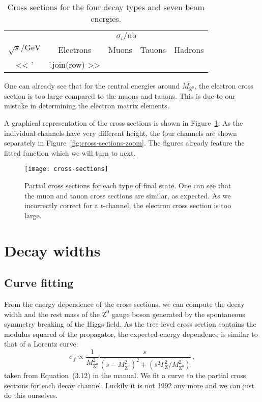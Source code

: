 \documentclass[11pt, english, fleqn, DIV=15, headinclude, BCOR=2cm]{scrreprt}
\newcommand\MZ{M_{\mathrm Z^0}}
\begin{document}
\begin{table}
    \centering
    \begin{tabular}{SSSSS}
        \toprule
        &  \\
        \cmidrule(l){2-5}
        {$\sqrt s / \si{\giga\electronvolt}$}
        & {Electrons}
        & {Muons}
        & {Tauons}
        & {Hadrons} \\
        \midrule
        << ' & '.join(row) >> \\
        \bottomrule
    \end{tabular}
    \caption{%
        Cross sections for the four decay types and seven beam energies.
    }
    \label{tab:cross-sections}
\end{table}

One can already see that for the central energies around $\MZ$, the electron
cross section is too large compared to the muons and tauons. This is due to our
mistake in determining the electron matrix elements.

A graphical representation of the cross sections is shown in
Figure~\ref{fig:cross-sections}. As the individual channels have very different
height, the four channels are shown separately in
Figure~\ref{fig:cross-sections-zoom}. The figures already feature the fitted
function which we will turn to next.

\begin{figure}
    \centering
    \texttt{[image: cross-sections]}
    \caption{%
        Partial cross sections for each type of final state. One can see that
        the muon and tauon cross sections are similar, as expected. As we
        incorrectly correct for a $t$-channel, the electron cross section is
        too large.
    }
    \label{fig:cross-sections}
\end{figure}



\section{Decay widths}

\subsection{Curve fitting}

From the energy dependence of the cross sections, we can compute the decay
width and the rest mass of the $\mathrm Z^0$ gauge boson generated by the
spontaneous symmetry breaking of the Higgs field. As the tree-level cross
section contains the modulus squared of the propagator, the expected energy
dependence is similar to that of a Lorentz curve:
\[
    \sigma_f \propto \frac{1}{\MZ^2} \frac{s}{(s - \MZ^2)^2 + (s^2
    \Gamma_\mathrm Z^2 / \MZ^2)} \,,
\]
taken from Equation~(3.12) in the manual. We fit a curve to the partial cross
sections for each decay channel. Luckily it is not 1992 any more and we can
just do this ourselves.
\end{document}
